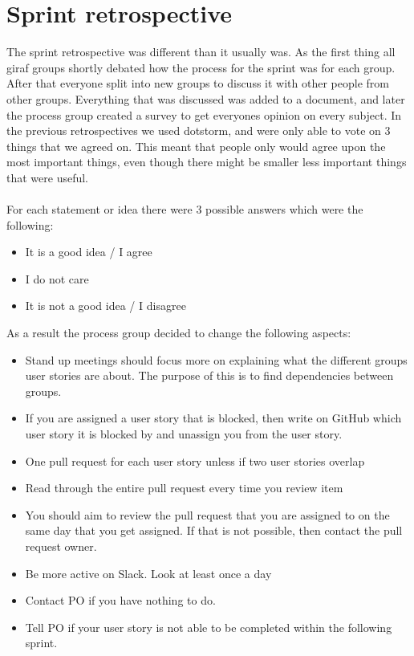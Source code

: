 \section{Sprint retrospective}
The sprint retrospective was different than it usually was. 
As the first thing all giraf groups shortly debated how the process for the sprint was for each group.
After that everyone split into new groups to discuss it with other people from other groups.
Everything that was discussed was added to a document, and later the process group created a survey to get everyones opinion on every subject.
In the previous retrospectives we used dotstorm, and were only able to vote on 3 things that we agreed on.
This meant that people only would agree upon the most important things, even though there might be smaller less important things that were useful.
\\\\
For each statement or idea there were 3 possible answers which were the following:
\begin{itemize}
    \item It is a good idea / I agree
    \item I do not care
    \item It is not a good idea / I disagree
\end{itemize}
As a result the process group decided to change the following aspects: 
\begin{itemize}
    \item Stand up meetings should focus more on explaining what the different groups user stories are about. The purpose of this is to find dependencies between groups.
    \item If you are assigned a user story that is blocked, then write on GitHub which user story it is blocked by and unassign you from the user story.
    \item One pull request for each user story unless if two user stories overlap
    \item Read through the entire pull request every time you review item
    \item You should aim to review the pull request that you are assigned to on the same day that you get assigned. If that is not possible, then contact the pull request owner.
    \item Be more active on Slack. Look at least once a day
    \item Contact PO if you have nothing to do.
    \item Tell PO if your user story is not able to be completed within the following sprint.
\end{itemize}
